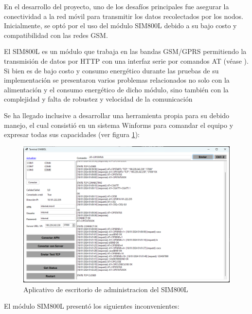 \label{sec:capaTransporte}

En el desarrollo del proyecto, uno de los desafíos principales fue asegurar la conectividad a la red móvil para transmitir los datos recolectados por los nodos. Inicialmente, se optó por el uso del módulo SIM800L debido a su bajo costo y compatibilidad con las redes GSM.

El SIM800L es un módulo que trabaja en las bandas GSM/GPRS permitiendo la transmisión de datos por HTTP con una interfaz serie por comandos AT (véase \cite{SIM800Datasheet}).
Si bien es de bajo costo y consumo energético durante las pruebas de su implementación se presentaron varios problemas relacionados no solo con la alimentación y el consumo energético de dicho módulo, sino también con la complejidad y falta de robustez y velocidad de la comunicación

Se ha llegado inclusive a desarrollar una herramienta propia para su debido manejo, el cual consistió en un sistema Winforms para comandar el equipo y expresar todas sus capacidades (ver figura \ref{fig:aplicativoSIM800L}):

\begin{figure}[H]
    \centering
    \includegraphics[width=1\linewidth]{Figures/Firmware/admin_gsm.png}
    \caption{Aplicativo de escritorio de administracion del SIM800L}
    \label{fig:aplicativoSIM800L}
\end{figure}

El módulo SIM800L presentó los siguientes inconvenientes:

